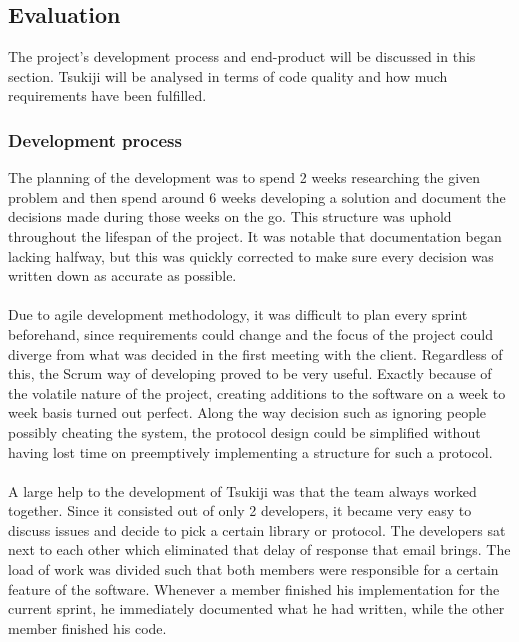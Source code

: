 \subsection{Evaluation}
The project's development process and end-product will be discussed in this section.
Tsukiji will be analysed in terms of code quality and how much requirements have been fulfilled.

\subsubsection{Development process}
The planning of the development was to spend 2 weeks researching the given problem and then spend around 6 weeks developing a solution and document the decisions made during those weeks on the go.
This structure was uphold throughout the lifespan of the project.
It was notable that documentation began lacking halfway, but this was quickly corrected to make sure every decision was written down as accurate as possible.\\
\\
Due to agile development methodology, it was difficult to plan every sprint beforehand, since requirements could change and the focus of the project could diverge from what was decided in the first meeting with the client.
Regardless of this, the Scrum way of developing proved to be very useful.
Exactly because of the volatile nature of the project, creating additions to the software on a week to week basis turned out perfect. 
Along the way decision such as ignoring people possibly cheating the system, the protocol design could be simplified without having lost time on preemptively implementing a structure for such a protocol.\\
\\
A large help to the development of Tsukiji was that the team always worked together. 
Since it consisted out of only 2 developers, it became very easy to discuss issues and decide to pick a certain library or protocol.
The developers sat next to each other which eliminated that delay of response that email brings. 
The load of work was divided such that both members were responsible for a certain feature of the software.
Whenever a member finished his implementation for the current sprint, he immediately documented what he had written, while the other member finished his code.

